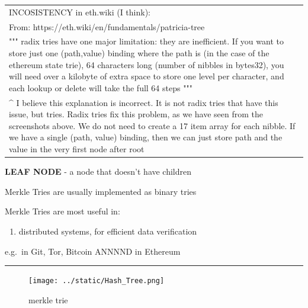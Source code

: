 \documentclass[11pt]{article}
\providecommand{\tightlist}{%
      \setlength{\itemsep}{0pt}\setlength{\parskip}{0pt}}
\begin{document}
    \begin{longtable}[]{@{}l@{}}
\toprule
\endhead
\begin{minipage}[t]{0.71\columnwidth}\raggedright
INCOSISTENCY in eth.wiki (I think):\strut
\end{minipage}\tabularnewline
\begin{minipage}[t]{0.71\columnwidth}\raggedright
From: https://eth.wiki/en/fundamentals/patricia-tree\strut
\end{minipage}\tabularnewline
\begin{minipage}[t]{0.71\columnwidth}\raggedright
""" radix tries have one major limitation: they are inefficient. If you
want to store just one (path,value) binding where the path is (in the
case of the ethereum state trie), 64 characters long (number of nibbles
in bytes32), you will need over a kilobyte of extra space to store one
level per character, and each lookup or delete will take the full 64
steps """\strut
\end{minipage}\tabularnewline
\begin{minipage}[t]{0.71\columnwidth}\raggedright
\^{} I believe this explanation is incorrect. It is not radix tries that
have this issue, but tries. Radix tries fix this problem, as we have
seen from the screenshots above. We do not need to create a 17 item
array for each nibble. If we have a single (path, value) binding, then
we can just store path and the value in the very first node after
root\strut
\end{minipage}\tabularnewline
\bottomrule
\end{longtable}

    \textbf{LEAF NODE} - a node that doesn't have children

Merkle Tries are usually implemented as binary tries

Merkle Tries are most useful in:

\begin{enumerate}
\def\labelenumi{(\roman{enumi})}
\tightlist
\item
  distributed systems, for efficient data verification
\end{enumerate}

e.g.~in Git, Tor, Bitcoin ANNNND in Ethereum

\begin{center}\rule{0.5\linewidth}{0.5pt}\end{center}

    \begin{figure}
\centering
\texttt{[image: ../static/Hash\_Tree.png]}
\caption{merkle trie}
\end{figure}
\end{document}
